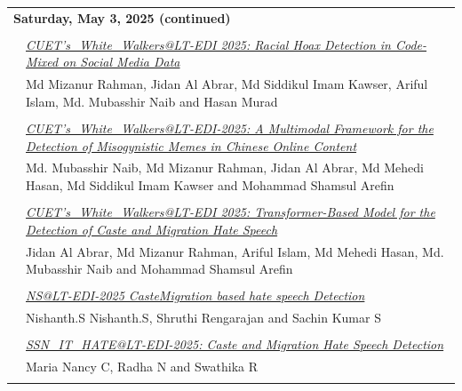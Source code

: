 \documentclass[11pt,oneside]{book}
\begin{document}
          \begin{tabular}{p{24mm}p{124mm}}
    \multicolumn{2}{l}{\bf Saturday, May 3, 2025 (continued)} \\\\
          
                      & \hyperlink{page.63}{\emph{CUET's\_White\_Walkers@LT-EDI 2025: Racial Hoax Detection in Code-Mixed on Social Media Data}}\\
        & Md Mizanur Rahman\index{Rahman}, Jidan Al Abrar\index{Abrar}, Md Siddikul Imam Kawser\index{Kawser}, Ariful Islam\index{Islam}, Md. Mubasshir Naib\index{Naib} and Hasan Murad\index{Murad}\\\\
                
                      & \hyperlink{page.68}{\emph{CUET's\_White\_Walkers@LT-EDI-2025: A Multimodal Framework for the Detection of Misogynistic Memes in Chinese Online Content}}\\
        & Md. Mubasshir Naib\index{Naib}, Md Mizanur Rahman\index{Rahman}, Jidan Al Abrar\index{Abrar}, Md Mehedi Hasan\index{Hasan}, Md Siddikul Imam Kawser\index{Kawser} and Mohammad Shamsul Arefin\index{Arefin}\\\\
                
                      & \hyperlink{page.75}{\emph{CUET's\_White\_Walkers@LT-EDI 2025: Transformer-Based Model for the Detection of Caste and Migration Hate Speech}}\\
        & Jidan Al Abrar\index{Abrar}, Md Mizanur Rahman\index{Rahman}, Ariful Islam\index{Islam}, Md Mehedi Hasan\index{Hasan}, Md. Mubasshir Naib\index{Naib} and Mohammad Shamsul Arefin\index{Arefin}\\\\
                
                      & \hyperlink{page.80}{\emph{NS@LT-EDI-2025 CasteMigration based hate speech Detection}}\\
        & Nishanth.S Nishanth.S\index{Nishanth.S}, Shruthi Rengarajan\index{Rengarajan} and Sachin Kumar S\index{S}\\\\
                
                      & \hyperlink{page.84}{\emph{SSN\_IT\_HATE@LT-EDI-2025: Caste and Migration Hate Speech Detection}}\\
        & Maria Nancy C\index{C}, Radha N\index{N} and Swathika R\index{R}\\\\
                

\end{tabular}
\end{document}
